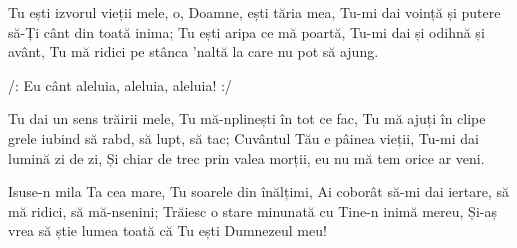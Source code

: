 \beginverse
Tu ești izvorul vieții mele, o, Doamne, ești tăria mea,
Tu-mi dai voință și putere să-Ți cânt din toată inima;
Tu ești aripa ce mă poartă, Tu-mi dai și odihnă și avânt,
Tu mă ridici pe stânca ’naltă la care nu pot să ajung.
\endverse

\beginchorus
/: Eu cânt aleluia, aleluia, aleluia! :/
\endchorus

\beginverse
Tu dai un sens trăirii mele, Tu mă-nplinești în tot ce fac,
Tu mă ajuți în clipe grele iubind să rabd, să lupt, să tac;
Cuvântul Tău e pâinea vieții, Tu-mi dai lumină zi de zi,
Și chiar de trec prin valea morții, eu nu mă tem orice ar veni.
\endverse

\beginverse
Isuse-n mila Ta cea mare, Tu soarele din înălțimi,
Ai coborât să-mi dai iertare, să mă ridici, să mă-nsenini;
Trăiesc o stare minunată cu Tine-n inimă mereu,
Și-aș vrea să știe lumea toată că Tu ești Dumnezeul meu!
\endverse
\endsong